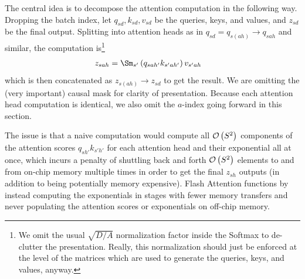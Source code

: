 The central idea is to decompose the attention computation in the following way. Dropping the batch
index, let $ q _{ sd }, k _{ sd }, v _{ sd } $ be the queries, keys, and values, and $ z _{ sd } $
be the final output. Splitting into attention heads as in $ q _{ sd } = q _{ s(ah) }\longrightarrow
q _{ sah } $ and similar, the computation is\footnote{We omit the usual $ \sqrt{D/A} $ normalization
factor inside the Softmax to de-clutter the presentation. Really, this normalization should just be
enforced at the level of the matrices which are used to generate the queries, keys, and values,
anyway.}
\begin{align}
    z _{ sah } &= \Sm _{ s' } \left ( q _{ sah' } k _{ s'ah' }   \right ) v _{ s'ah }
\end{align}
which is then concatenated as $ z _{ s(ah) }\longrightarrow  z _{ sd } $ to get the result. We are
omitting the (very important) causal mask for clarity of presentation.  Because each attention head
computation is identical, we also omit the $ a $-index going forward in this section.

The issue is that a naive computation would compute all $ \mathcal{O} \left( S ^{ 2 } \right)  $
components of the attention scores $ q _{ sh' } k _{ s'h' } $ for each attention head and their
exponential all at once, which incurs a penalty of shuttling back and forth $ \mathcal{O} \left( S ^{ 2 }
\right)  $ elements to and from on-chip memory multiple times in order to get the final $ z _{ sh }
$ outputs (in addition to being potentially memory expensive). Flash Attention functions by instead
computing the exponentials in stages with fewer memory transfers and never populating the attention
scores or exponentials on off-chip memory.

